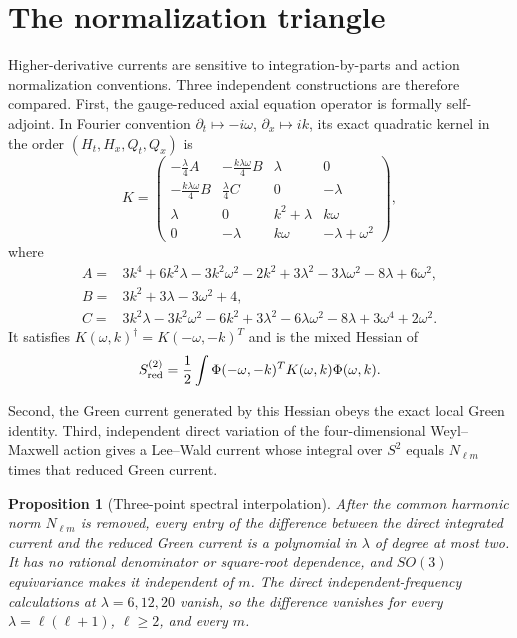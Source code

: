 \documentclass[11pt]{article}
\newtheorem{proposition}[theorem]{Proposition}
\theoremstyle{remark}
\begin{document}
\section{The normalization triangle}\label{sec:normalization}

Higher-derivative currents are sensitive to integration-by-parts and action
normalization conventions. Three independent constructions are therefore
compared. First, the gauge-reduced axial equation operator is formally
self-adjoint. In Fourier convention $\partial_t\mapsto-i\omega$,
$\partial_x\mapsto ik$, its exact quadratic kernel in the order
$(H_t,H_x,Q_t,Q_x)$ is
\begin{equation}\label{eq:kernel}
K=\begin{pmatrix}
-\frac\lambda4 A&-\frac{k\lambda\omega}{4}B&\lambda&0\\
-\frac{k\lambda\omega}{4}B&\frac\lambda4 C&0&-\lambda\\
\lambda&0&k^2+\lambda&k\omega\\
0&-\lambda&k\omega&-\lambda+\omega^2
\end{pmatrix},
\end{equation}
where
\begin{align}
A={}&3k^4+6k^2\lambda-3k^2\omega^2-2k^2
 +3\lambda^2-3\lambda\omega^2-8\lambda+6\omega^2,\\
B={}&3k^2+3\lambda-3\omega^2+4,\\
C={}&3k^2\lambda-3k^2\omega^2-6k^2+3\lambda^2
 -6\lambda\omega^2-8\lambda+3\omega^4+2\omega^2.
\end{align}
It satisfies $K(\omega,k)^\dagger=K(-\omega,-k)^T$ and is the mixed Hessian
of
\begin{equation}
 S^{(2)}_{\rm red}=\frac12\int
 \Phi(-\omega,-k)^TK(\omega,k)\Phi(\omega,k).
\end{equation}

Second, the Green current generated by this Hessian obeys the exact local
Green identity. Third, independent direct variation of the four-dimensional
Weyl--Maxwell action gives a Lee--Wald current whose integral over $S^2$
equals $N_{\ell m}$ times that reduced Green current.

\begin{proposition}[Three-point spectral interpolation]
\label{prop:interpolation}
After the common harmonic norm $N_{\ell m}$ is removed, every entry of the
difference between the direct integrated current and the reduced Green
current is a polynomial in $\lambda$ of degree at most two. It has no
rational denominator or square-root dependence, and $SO(3)$ equivariance
makes it independent of $m$. The direct independent-frequency calculations
at $\lambda=6,12,20$ vanish, so the difference vanishes for every
$\lambda=\ell(\ell+1)$, $\ell\geq2$, and every $m$.
\end{proposition}
\end{document}
